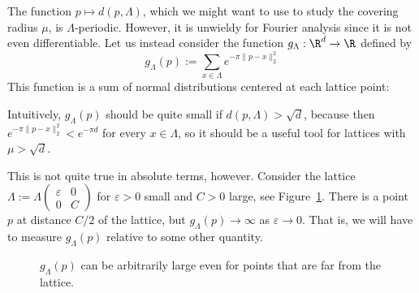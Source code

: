 The function $p \mapsto d(p,\Lambda)$,
which we might want to use to study the covering radius $\mu$,
is $\Lambda$-periodic.
However,
it is unwieldy for Fourier analysis since it is not even differentiable.
Let us instead consider the function $g_\Lambda: \R^d \to \R$ defined by
\[
  g_\Lambda(p) := \sum_{x \in \Lambda} e^{-\pi \|p - x\|_2^2}
\]
This function is a sum of normal distributions centered at each lattice point:
\begin{center}
\end{center}
Intuitively, $g_\Lambda(p)$ should be quite small if $d(p,\Lambda) > \sqrt{d}$,
because then $e^{-\pi \|p - x\|_2^2} < e^{-\pi d}$ for every $x \in \Lambda$,
so it should be a useful tool for lattices with $\mu > \sqrt{d}$.

This is not quite true in absolute terms, however.
Consider the lattice $\Lambda := \Lambda \begin{pmatrix} \varepsilon & 0 \\ 0 & C \end{pmatrix}$
for $\varepsilon > 0$ small and $C > 0$ large, see Figure~\ref{fig:g-sparse-dense-lattice}.
There is a point $p$ at distance $C/2$ of the lattice,
but $g_\Lambda(p) \to \infty$ as $\varepsilon \to 0$.
That is, we will have to measure $g_\Lambda(p)$ relative to some other quantity.

\begin{figure}
  \begin{center}
  \end{center}
  \caption{$g_\Lambda(p)$ can be arbitrarily large even for points that are far from the lattice.}
  \label{fig:g-sparse-dense-lattice}
\end{figure}

